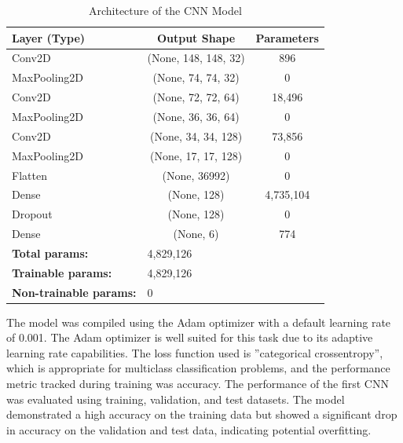 \begin{table}[H]
\centering
\caption{Architecture of the CNN Model}
\begin{tabular}{|l|c|c|}
\hline
\textbf{Layer (Type)}          & \textbf{Output Shape} & \textbf{Parameters} \\ \hline
Conv2D                         & (None, 148, 148, 32)  & 896                 \\ \hline
MaxPooling2D                   & (None, 74, 74, 32)    & 0                   \\ \hline
Conv2D                         & (None, 72, 72, 64)    & 18,496              \\ \hline
MaxPooling2D                   & (None, 36, 36, 64)    & 0                   \\ \hline
Conv2D                         & (None, 34, 34, 128)   & 73,856              \\ \hline
MaxPooling2D                   & (None, 17, 17, 128)   & 0                   \\ \hline
Flatten                        & (None, 36992)         & 0                   \\ \hline
Dense                          & (None, 128)           & 4,735,104           \\ \hline
Dropout                        & (None, 128)           & 0                   \\ \hline
Dense                          & (None, 6)           & 774           \\ \hline
\hline
\textbf{Total params:}        & \multicolumn{2}{l|}{4,829,126}              \\ \hline
\textbf{Trainable params:}    & \multicolumn{2}{l|}{4,829,126}              \\ \hline
\textbf{Non-trainable params:} & \multicolumn{2}{l|}{0}                      \\ \hline
\end{tabular}
\label{tab:cnn_architecture}
\end{table}


The model was compiled using the Adam optimizer with a default learning rate of 0.001. The Adam optimizer is well suited for this task due to its adaptive learning rate capabilities.
The loss function used is ”categorical crossentropy”, which is appropriate for multiclass classification problems, and the performance metric tracked during training was accuracy.
The performance of the first CNN was evaluated using training, validation, and test datasets. The model demonstrated a high accuracy on the training data but showed a significant drop in accuracy on the validation and test data, indicating potential overfitting.

